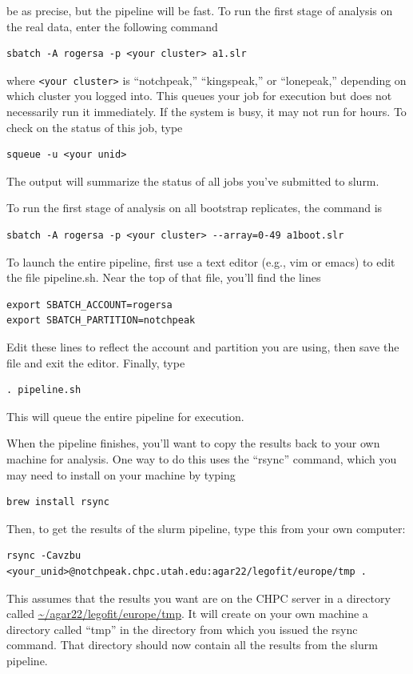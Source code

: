 \documentclass[11pt]{article}
\begin{document}
be as precise, but the pipeline will be fast. To run the first stage
of analysis on the real data, enter the following command
\begin{verbatim}
sbatch -A rogersa -p <your cluster> a1.slr
\end{verbatim}
where \verb|<your cluster>| is ``notchpeak,'' ``kingspeak,'' or
``lonepeak,'' depending on which cluster you logged into.
This queues your job for execution but does not necessarily run it
immediately. If the system is busy, it may not run for hours. To check
on the status of this job, type
\begin{verbatim}
squeue -u <your unid>
\end{verbatim}
The output will summarize the status of all jobs you've submitted to
slurm.

To run the first stage of analysis on all bootstrap replicates, the
command is
\begin{verbatim}
sbatch -A rogersa -p <your cluster> --array=0-49 a1boot.slr
\end{verbatim}

To launch the entire pipeline, first use a text editor (e.g., vim or
emacs) to edit the file pipeline.sh. Near the top of that file, you'll
find the lines
\begin{verbatim}
export SBATCH_ACCOUNT=rogersa
export SBATCH_PARTITION=notchpeak
\end{verbatim}
Edit these lines to reflect the account and partition you are using,
then save the file and exit the editor. Finally, type
\begin{verbatim}
. pipeline.sh
\end{verbatim}
This will queue the entire pipeline for execution.

When the pipeline finishes, you'll want to copy the results back to
your own machine for analysis. One way to do this uses the
``rsync'' command, which you may need to install on your machine by
typing
\begin{verbatim}
brew install rsync
\end{verbatim}
Then, to get the results of the slurm pipeline, type this from your
own computer:
\begin{verbatim}
rsync -Cavzbu <your_unid>@notchpeak.chpc.utah.edu:agar22/legofit/europe/tmp .
\end{verbatim}
This assumes that the results you want are on the CHPC server in a
directory called \url{~/agar22/legofit/europe/tmp}. It will create on
your own machine a directory called ``tmp'' in the directory from
which you issued the rsync command. That directory should now contain
all the results from the slurm pipeline.
\end{document}
